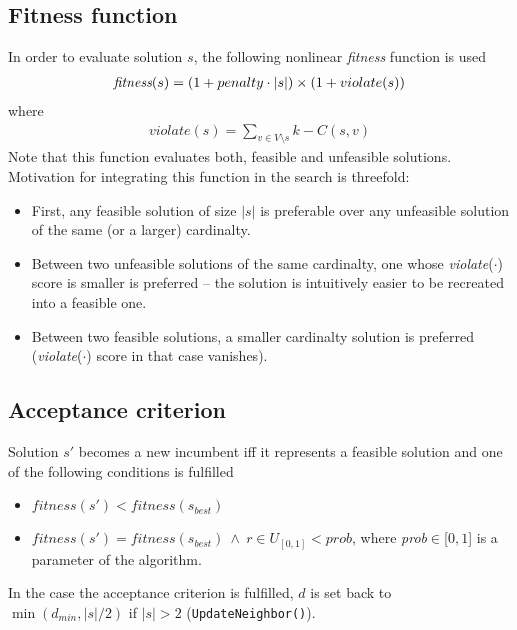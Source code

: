 \documentclass[dvipsnames,format=sigconf,anonymous=true,review=true]{acmart}
\begin{document}
   \subsection{Fitness function}
       In order to evaluate solution $s$, the following nonlinear \emph{fitness} function is used 
       \begin{align}\label{eq:fitness}
          \emph{fitness}(s) = ( 1+ penalty \cdot |s|) \times ( 1 + violate(s))
       \end{align}
       where 
       \begin{align}
       	   violate(s) = \sum_{v \in V \setminus s}   k - C(s, v)  
       \end{align}
   Note that this function evaluates both, feasible and unfeasible solutions. 
       Motivation for integrating this function  in the search is threefold:
       \begin{itemize}
       	\item First, any feasible solution of size $|s|$ is preferable over any unfeasible solution of the same (or a larger) cardinalty. 
       	\item Between two unfeasible solutions of the same cardinalty, one whose \emph{violate}($\cdot$) score is smaller is preferred -- the solution is intuitively easier to be recreated into a feasible one.  
       	\item Between two feasible solutions, a smaller cardinalty solution is preferred (\emph{violate}($\cdot$) score in that case vanishes). 
       \end{itemize}
   
   \subsection{Acceptance criterion}
   
   Solution $s'$ becomes a new incumbent iff it represents a feasible solution and  one of the following conditions is fulfilled
   \begin{itemize}
   	\item $fitness(s') < fitness(s_{best})$ 
   	\item  $fitness(s') = fitness(s_{best})\  \wedge\ r \in U_{\left[0, 1\right]} <  prob  $, where \emph{prob}$\in$[$0,1$] is a parameter of the algorithm.
   \end{itemize}
    In the case the acceptance criterion is fulfilled, $d$ is set back to $\min(d_{min}, |s|/2)$ if $|s|>2$ (\texttt{UpdateNeighbor()}). 
   
\end{document}
